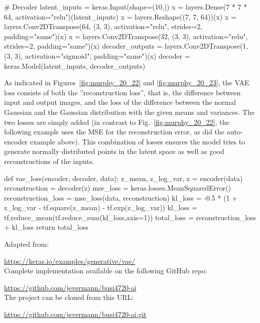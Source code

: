 \begin{pythoncode}
# Decoder
latent_inputs = keras.Input(shape=(10,))
x = layers.Dense(7 * 7 * 64, activation="relu")(latent_inputs)
x = layers.Reshape((7, 7, 64))(x)
x = layers.Conv2DTranspose(64, (3, 3), activation="relu", 
             strides=2, padding="same")(x)
x = layers.Conv2DTranspose(32, (3, 3), activation="relu", 
             strides=2, padding="same")(x)
decoder_outputs = layers.Conv2DTranspose(1, (3, 3), 
             activation="sigmoid", padding="same")(x)
decoder = keras.Model(latent_inputs, decoder_outputs)
\end{pythoncode}

As indicated in Figures~\ref{fig:murphy_20_22} and \ref{fig:murphy_20_23}, the VAE loss consists of both the ''reconstruction loss'', that is, the difference between input and output images, and the loss of the difference between the normal Gaussian and the Gaussian distribution with the given means and variances. The two losses are simply added (in contrast to Fig.~\ref{fig:murphy_20_22}, the following example uses the MSE for the reconstruction error, as did the auto-encoder example above). This combination of losses ensures the model tries to generate normally distributed points in the latent space as well as good reconstructions of the inputs.

\begin{pythoncode}
def vae_loss(encoder, decoder, data):
    z_mean, z_log_var, z = encoder(data)
    reconstruction = decoder(z)
    mse_loss = keras.losses.MeanSquaredError()
    reconstruction_loss = mse_loss(data, reconstruction)
    kl_loss = -0.5 * (1 +
                      z_log_var -
                      tf.square(z_mean) -
                      tf.exp(z_log_var))
    kl_loss = tf.reduce_mean(tf.reduce_sum(kl_loss,axis=1))
    total_loss = reconstruction_loss + kl_loss
    return total_loss
\end{pythoncode}

\begin{resourcebox}
Adapted from: 

\small\url{https://keras.io/examples/generative/vae/}\normalsize \\

Complete implementation available on the following GitHub repo:

\small\url{https://github.com/jevermann/busi4720-ai}\normalsize \\

The project can be cloned from this URL:

\small\url{https://github.com/jevermann/busi4720-ai.git}\normalsize
\end{resourcebox}


